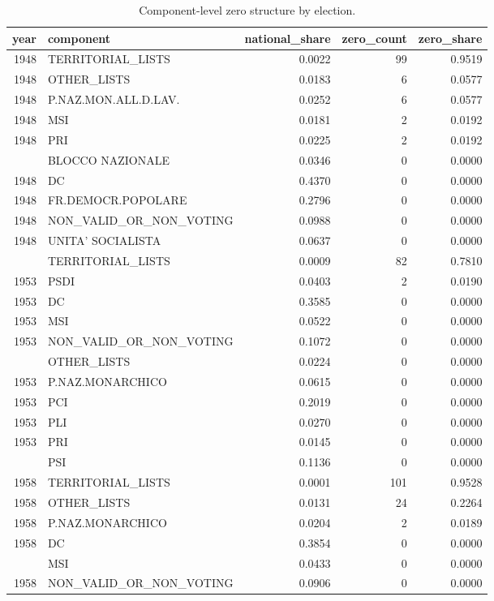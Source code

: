 
\begin{longtable}[t]{rlrrr}
\caption{\label{tab:app_component_zeros}Component-level zero structure by election.}\\
\toprule
year & component & national\_share & zero\_count & zero\_share\\
\midrule
1948 & TERRITORIAL\_LISTS & 0.0022 & 99 & 0.9519\\
1948 & OTHER\_LISTS & 0.0183 & 6 & 0.0577\\
1948 & P.NAZ.MON.ALL.D.LAV. & 0.0252 & 6 & 0.0577\\
1948 & MSI & 0.0181 & 2 & 0.0192\\
1948 & PRI & 0.0225 & 2 & 0.0192\\
\addlinespace
1948 & BLOCCO NAZIONALE & 0.0346 & 0 & 0.0000\\
1948 & DC & 0.4370 & 0 & 0.0000\\
1948 & FR.DEMOCR.POPOLARE & 0.2796 & 0 & 0.0000\\
1948 & NON\_VALID\_OR\_NON\_VOTING & 0.0988 & 0 & 0.0000\\
1948 & UNITA' SOCIALISTA & 0.0637 & 0 & 0.0000\\
\addlinespace
1953 & TERRITORIAL\_LISTS & 0.0009 & 82 & 0.7810\\
1953 & PSDI & 0.0403 & 2 & 0.0190\\
1953 & DC & 0.3585 & 0 & 0.0000\\
1953 & MSI & 0.0522 & 0 & 0.0000\\
1953 & NON\_VALID\_OR\_NON\_VOTING & 0.1072 & 0 & 0.0000\\
\addlinespace
1953 & OTHER\_LISTS & 0.0224 & 0 & 0.0000\\
1953 & P.NAZ.MONARCHICO & 0.0615 & 0 & 0.0000\\
1953 & PCI & 0.2019 & 0 & 0.0000\\
1953 & PLI & 0.0270 & 0 & 0.0000\\
1953 & PRI & 0.0145 & 0 & 0.0000\\
\addlinespace
1953 & PSI & 0.1136 & 0 & 0.0000\\
1958 & TERRITORIAL\_LISTS & 0.0001 & 101 & 0.9528\\
1958 & OTHER\_LISTS & 0.0131 & 24 & 0.2264\\
1958 & P.NAZ.MONARCHICO & 0.0204 & 2 & 0.0189\\
1958 & DC & 0.3854 & 0 & 0.0000\\
\addlinespace
1958 & MSI & 0.0433 & 0 & 0.0000\\
1958 & NON\_VALID\_OR\_NON\_VOTING & 0.0906 & 0 & 0.0000\\

\end{longtable}
